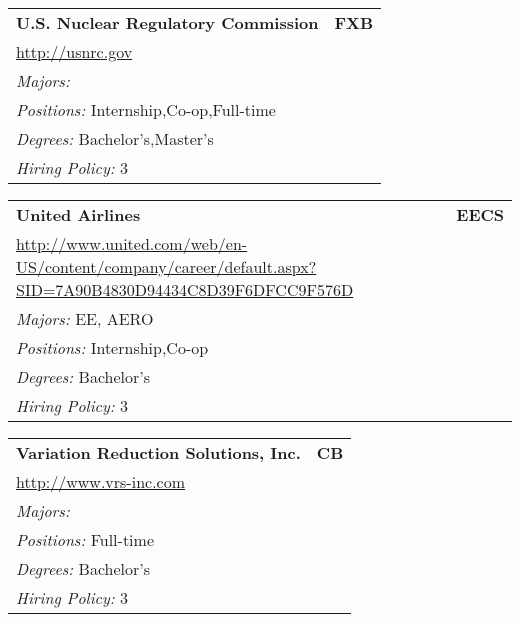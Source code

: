 \documentclass[twoside]{article}
\begin{document}
\begin{center}
\begin{multicols}{3}
\begin{FlushLeft}
\begin{minipage}{.9\columnwidth}
\end{minipage}
 
\begin{minipage}{.9\columnwidth}\begin{tabularx}{.95\columnwidth}{Xr}
                 {\Large\bf U.S. Nuclear Regulatory Commission} & {\Large\bf FXB}\\
    \multicolumn{2}{p{.95\columnwidth}}{\url{http://usnrc.gov}}\\
    \multicolumn{2}{p{.95\columnwidth}}{\emph{Majors:} }\\
    \multicolumn{2}{p{.95\columnwidth}}{\emph{Positions:} Internship,Co-op,Full-time}\\
    \multicolumn{2}{p{.95\columnwidth}}{\emph{Degrees:} Bachelor's,Master's}\\
    \multicolumn{2}{p{.95\columnwidth}}{\emph{Hiring Policy:} 3}\\
    \end{tabularx}
    
\end{minipage}
 
\begin{minipage}{.9\columnwidth}\begin{tabularx}{.95\columnwidth}{Xr}
                 {\Large\bf United Airlines} & {\Large\bf EECS}\\
    \multicolumn{2}{p{.95\columnwidth}}{\url{http://www.united.com/web/en-US/content/company/career/default.aspx?SID=7A90B4830D94434C8D39F6DFCC9F576D}}\\
    \multicolumn{2}{p{.95\columnwidth}}{\emph{Majors:} EE, AERO}\\
    \multicolumn{2}{p{.95\columnwidth}}{\emph{Positions:} Internship,Co-op}\\
    \multicolumn{2}{p{.95\columnwidth}}{\emph{Degrees:} Bachelor's}\\
    \multicolumn{2}{p{.95\columnwidth}}{\emph{Hiring Policy:} 3}\\
    \end{tabularx}
    
\end{minipage}
 
\begin{minipage}{.9\columnwidth}\begin{tabularx}{.95\columnwidth}{Xr}
                 {\Large\bf Variation Reduction Solutions, Inc.} & {\Large\bf CB}\\
    \multicolumn{2}{p{.95\columnwidth}}{\url{http://www.vrs-inc.com}}\\
    \multicolumn{2}{p{.95\columnwidth}}{\emph{Majors:} }\\
    \multicolumn{2}{p{.95\columnwidth}}{\emph{Positions:} Full-time}\\
    \multicolumn{2}{p{.95\columnwidth}}{\emph{Degrees:} Bachelor's}\\
    \multicolumn{2}{p{.95\columnwidth}}{\emph{Hiring Policy:} 3}\\
    \end{tabularx}
    

\end{minipage}
\end{FlushLeft}
\end{multicols}
\end{center}
\end{document}
